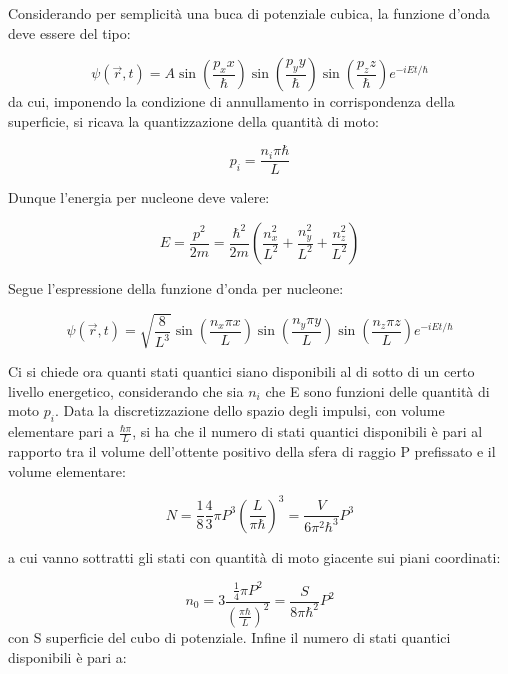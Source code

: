 \documentclass{article}
\begin{document}
Considerando per semplicità una buca di potenziale cubica, la funzione d'onda deve essere del tipo:

\begin{equation}
    \psi(\vec{r},t)= A\sin(\frac{p_x x}{\hbar})\sin(\frac{p_y y}{\hbar})\sin(\frac{p_z z}{\hbar})e^{-iEt/\hbar}
\end{equation}
da cui, imponendo la condizione di annullamento in corrispondenza della superficie, si ricava la quantizzazione della quantità di moto:

\begin{equation}
    p_i=\frac{n_i\pi\hbar}{L}
\end{equation}

Dunque l'energia per nucleone deve valere:

\begin{equation}
    E=\frac{p^2}{2m}=\frac{\hbar^2}{2m}(\frac{n_x^2}{L^2}+\frac{n_y^2}{L^2}+\frac{n_z^2}{L^2})
\end{equation}

Segue l'espressione della funzione d'onda per nucleone:

\begin{equation}
    \psi(\vec{r},t)=\sqrt{\frac{8}{L^3}}\sin(\frac{n_x\pi x}{L})\sin(\frac{n_y\pi y}{L})\sin(\frac{n_z\pi z}{L})e^{-iEt/\hbar}
\end{equation}

Ci si chiede ora quanti stati quantici siano disponibili al di sotto di un certo livello energetico, considerando che sia $n_i$ che E sono funzioni delle quantità di moto $p_i$.
Data la discretizzazione dello spazio degli impulsi, con volume elementare pari a $\frac{\hbar \pi}{L}$, si ha che il numero di stati quantici disponibili è pari al rapporto
tra il volume dell'ottente positivo della sfera di raggio P prefissato e il volume elementare:

\begin{equation}
    N=\frac{1}{8}\frac{4}{3}\pi P^3(\frac{L}{\pi\hbar})^3=\frac{V}{6\pi^2 \hbar^3}P^3
\end{equation}

a cui vanno sottratti gli stati con quantità di moto giacente sui piani coordinati:

\begin{equation}
 n_0= 3\frac{\frac{1}{4}\pi P^2}{(\frac{\pi \hbar}{L})^2}= \frac{S}{8\pi\hbar^2}P^2
\end{equation}
con S superficie del cubo di potenziale.
Infine il numero di stati quantici disponibili è pari a:
\end{document}

